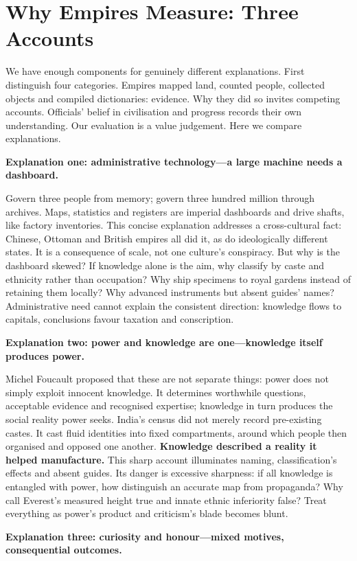 \section{Why Empires Measure: Three Accounts}
We have enough components for genuinely different explanations. First distinguish four categories. Empires mapped land, counted people, collected objects and compiled dictionaries: evidence. Why they did so invites competing accounts. Officials' belief in civilisation and progress records their own understanding. Our evaluation is a value judgement. Here we compare explanations.

\textbf{Explanation one: administrative technology---a large machine needs a dashboard.}

Govern three people from memory; govern three hundred million through archives. Maps, statistics and registers are imperial dashboards and drive shafts, like factory inventories. This concise explanation addresses a cross-cultural fact: Chinese, Ottoman and British empires all did it, as do ideologically different states. It is a consequence of scale, not one culture's conspiracy. But why is the dashboard skewed? If knowledge alone is the aim, why classify by caste and ethnicity rather than occupation? Why ship specimens to royal gardens instead of retaining them locally? Why advanced instruments but absent guides' names? Administrative need cannot explain the consistent direction: knowledge flows to capitals, conclusions favour taxation and conscription.

\textbf{Explanation two: power and knowledge are one---knowledge itself produces power.}

Michel Foucault proposed that these are not separate things: power does not simply exploit innocent knowledge. It determines worthwhile questions, acceptable evidence and recognised expertise; knowledge in turn produces the social reality power seeks. India's census did not merely record pre-existing castes. It cast fluid identities into fixed compartments, around which people then organised and opposed one another. \textbf{Knowledge described a reality it helped manufacture.} This sharp account illuminates naming, classification's effects and absent guides. Its danger is excessive sharpness: if all knowledge is entangled with power, how distinguish an accurate map from propaganda? Why call Everest's measured height true and innate ethnic inferiority false? Treat everything as power's product and criticism's blade becomes blunt.

\textbf{Explanation three: curiosity and honour---mixed motives, consequential outcomes.}

